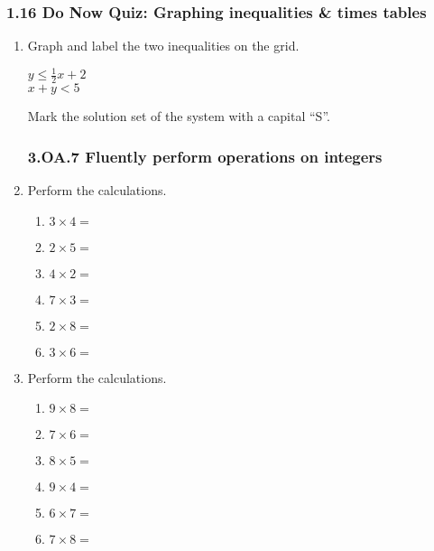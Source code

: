 \documentclass[12pt, twoside]{article}
\begin{document}
\subsubsection*{1.16 Do Now Quiz: Graphing inequalities \& times tables}
\begin{enumerate}
\item Graph and label the two inequalities on the grid. 

  \begin{multicols}{2}
    $\displaystyle y \leq \frac{1}{2}x + 2$ \\
    $x + y < 5$
  \end{multicols} \vspace{1cm}

  \begin{center}
  \end{center}

Mark the solution set of the system with a capital ``S''.

\newpage
\subsubsection*{3.OA.7 Fluently perform operations on integers}
\item Perform the calculations.
  \begin{multicols}{2}
    \begin{enumerate}[itemsep=1cm]
      \item $3 \times 4 =$
      \item $2 \times 5 =$
      \item $4 \times 2 =$
      \item $7 \times 3 =$
      \item $2 \times 8 =$
      \item $3 \times 6 =$
    \end{enumerate}
    \end{multicols} \vspace{0.25cm}

    \item Perform the calculations.
    \begin{multicols}{2}
    \begin{enumerate}[itemsep=1cm]
      \item $9 \times 8 =$
      \item $7 \times 6 =$
      \item $8 \times 5 =$
      \item $9 \times 4 =$
      \item $6 \times 7 =$
      \item $7 \times 8 =$
    \end{enumerate}
    \end{multicols} \vspace{0.25cm}


\end{enumerate}
\end{document}
